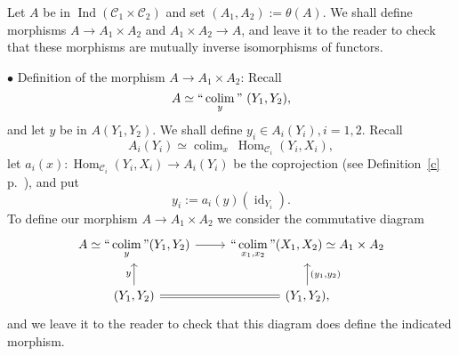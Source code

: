 \documentclass[12pt]{article}
\theoremstyle{remark}
\theoremstyle{definition}
\newcommand{\bu}{\bullet}
\newcommand{\nn}{\noindent}
\newcommand{\C}{\mathcal C}
\DeclareMathOperator*{\coli}{colim}
\DeclareMathOperator*{\co}{colim}
\DeclareMathOperator*{\ic}{``\coli"}
\DeclareMathOperator{\id}{id}
\DeclareMathOperator{\Hom}{Hom}%
\DeclareMathOperator{\Ind}{Ind}
\begin{document}
Let $A$ be in $\Ind(\C_1\times\C_2)$ and set $(A_1,A_2):=\theta(A)$. We shall define morphisms $A\to A_1\times A_2$ and $A_1\times A_2\to A$, and leave it to the reader to check that these morphisms are mutually inverse isomorphisms of functors. 

\nn$\bu$ Definition of the morphism $A\to A_1\times A_2$: Recall 
$$
A\simeq\ic_y\ (Y_1,Y_2), 
$$ 
and let $y$ be in $A(Y_1,Y_2)$. We shall define $y_i\in A_i(Y_i),i=1,2$. Recall 
$$
A_i(Y_i)\simeq\co_x\ \Hom_{\C_i}(Y_i,X_i), 
$$ 
let $a_i(x):\Hom_{\C_i}(Y_i,X_i)\to A_i(Y_i)$ be the coprojection (see Definition~\ref{c} p.~\pageref{c}), and put 
$$
y_i:=a_i(y)(\id_{Y_i}). 
$$ 
To define our morphism $A\to A_1\times A_2$ we consider the commutative diagram
$$
\begin{tikzcd}
A\simeq\displaystyle\ic_y(Y_1,Y_2)\ar{r}&\displaystyle\ic_{x_1,x_2}(X_1,X_2)\simeq A_1\times A_2\\ 
(Y_1,Y_2)\ar{u}{y}\ar[equal]{r}&(Y_1,Y_2),\ar{u}[swap]{(y_1,y_2)}
\end{tikzcd}
$$ 
and we leave it to the reader to check that this diagram does define the indicated morphism.
\end{document}
